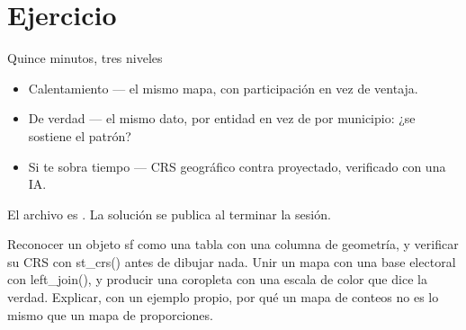 \section{Ejercicio}

\begin{frame}{Quince minutos, tres niveles}
  \vspace{0.4em}
  \begin{itemize}\setlength{\itemsep}{1.0em}
    \item \ac{Calentamiento} — el mismo mapa, con participación en
          vez de ventaja.
    \item \ac{De verdad} — el mismo dato, por entidad en vez de por
          municipio: ¿se sostiene el patrón?
    \item \ac{Si te sobra tiempo} — CRS geográfico contra
          proyectado, verificado con una IA.
  \end{itemize}

  \vspace{1.2em}
  {\small\color{grisTenue}El archivo es . La
  solución se publica al terminar la sesión.}
\end{frame}

\yasabemos
  {Reconocer un objeto sf como una tabla con una columna de geometría, y
   verificar su CRS con st\_crs() antes de dibujar nada.}
  {Unir un mapa con una base electoral con left\_join(), y producir una
   coropleta con una escala de color que dice la verdad.}
  {Explicar, con un ejemplo propio, por qué un mapa de conteos no es lo
   mismo que un mapa de proporciones.}



